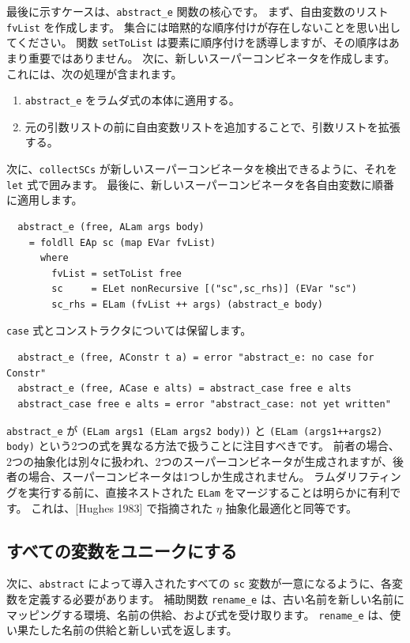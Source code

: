 \documentclass{jbook}
\begin{document}
最後に示すケースは、\texttt{abstract\_e} 関数の核心です。
まず、自由変数のリスト \texttt{fvList} を作成します。
集合には暗黙的な順序付けが存在しないことを思い出してください。
関数 \texttt{setToList} は要素に順序付けを誘導しますが、その順序はあまり重要ではありません。
次に、新しいスーパーコンビネータを作成します。
これには、次の処理が含まれます。

\begin{enumerate}
	\item \texttt{abstract\_e} をラムダ式の本体に適用する。
	\item 元の引数リストの前に自由変数リストを追加することで、引数リストを拡張する。
\end{enumerate}

次に、\texttt{collectSCs} が新しいスーパーコンビネータを検出できるように、それを \texttt{let} 式で囲みます。
最後に、新しいスーパーコンビネータを各自由変数に順番に適用します。

\begin{verbatim}
  abstract_e (free, ALam args body)
    = foldll EAp sc (map EVar fvList)
      where
        fvList = setToList free
        sc     = ELet nonRecursive [("sc",sc_rhs)] (EVar "sc")
        sc_rhs = ELam (fvList ++ args) (abstract_e body)
\end{verbatim}

\texttt{case} 式とコンストラクタについては保留します。

\begin{verbatim}
  abstract_e (free, AConstr t a) = error "abstract_e: no case for Constr"
  abstract_e (free, ACase e alts) = abstract_case free e alts
  abstract_case free e alts = error "abstract_case: not yet written"
\end{verbatim}

\texttt{abstract\_e} が \texttt{(ELam args1 (ELam args2 body))} と \texttt{(ELam (args1++args2) body)} という2つの式を異なる方法で扱うことに注目すべきです。
前者の場合、2つの抽象化は別々に扱われ、2つのスーパーコンビネータが生成されますが、後者の場合、スーパーコンビネータは1つしか生成されません。
ラムダリフティングを実行する前に、直接ネストされた \texttt{ELam} をマージすることは明らかに有利です。
これは、[Hughes 1983] で指摘された $\eta$ 抽象化最適化と同等です。

\subsection{すべての変数をユニークにする}

次に、\texttt{abstract} によって導入されたすべての \texttt{sc} 変数が一意になるように、各変数を定義する必要があります。
補助関数 \texttt{rename\_e} は、古い名前を新しい名前にマッピングする環境、名前の供給、および式を受け取ります。
\texttt{rename\_e} は、使い果たした名前の供給と新しい式を返します。
\end{document}
